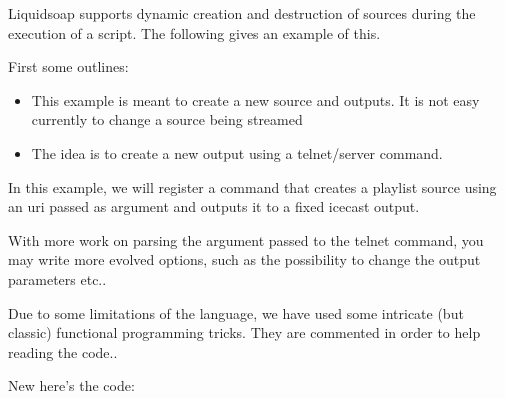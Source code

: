 Liquidsoap supports dynamic creation and destruction of sources 
during the execution of a script. The following gives an example
of this.

First some outlines:

\begin{itemize}
\item This example is meant to create a new source and outputs. It is not easy currently to change a source being streamed
\item The idea is to create a new output using a telnet/server command.

\end{itemize}
In this example, we will register a command that creates a playlist source using an uri passed
as argument and outputs it to a fixed icecast output.

With more work on parsing the argument passed to the telnet command,
you may write more evolved options, such as the possibility to change
the output parameters etc..

Due to some limitations of the language, we have used some
intricate (but classic) functional programming tricks. They are
commented in order to help reading the code..

New here's the code:

